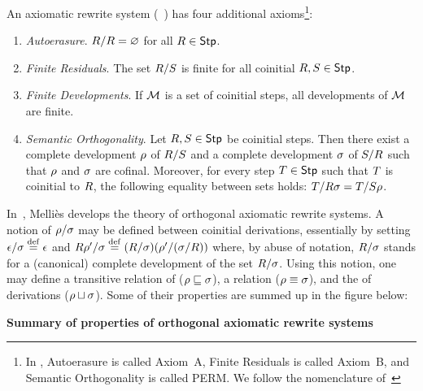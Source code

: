 An  axiomatic rewrite system (\cf~\cite[Sec.~2.3]{thesismellies})
has four additional axioms\footnote{In \cite{thesismellies},
Autoerasure is called Axiom~A, Finite Residuals is called Axiom~B, and Semantic Orthogonality is called PERM.
We follow the nomenclature of~\cite{DBLP:conf/popl/AccattoliBKL14}}:
\begin{enumerate}
\item {\em Autoerasure}.
  $R/R = \varnothing$ for all $R \in \mathsf{Stp}$.
\item {\em Finite Residuals}.
  The set $R/S$ is finite for all coinitial $R,S \in \mathsf{Stp}$.
\item {\em Finite Developments}.
  If $\mathcal{M}$ is a set of coinitial steps,
  all developments of $\mathcal{M}$ are finite.
\item {\em Semantic Orthogonality}.
  Let $R,S \in \mathsf{Stp}$ be coinitial steps.
  Then there exist a complete development $\rho$ of $R/S$
  and a complete development $\sigma$ of $S/R$
  such that $\rho$ and $\sigma$ are cofinal.
  Moreover,
  for every step $T \in \mathsf{Stp}$ such that $T$ is coinitial to $R$,
  the following equality between sets holds:
  $T/R\sigma = T/S\rho$.
\end{enumerate}
In~\cite{thesismellies}, Melli\`es develops
the theory of orthogonal axiomatic rewrite systems.
A notion of 
$\rho/\sigma$ may be defined between coinitial derivations,
essentially by setting $\epsilon/\sigma \overset{\mathrm{def}}{=} \epsilon$
and $R\rho'/\sigma \overset{\mathrm{def}}{=} (R/\sigma)(\rho'/(\sigma/R))$
where, by abuse of notation, $R/\sigma$ stands for a (canonical) complete development
of the set $R/\sigma$.
Using this notion, one may define
a transitive relation of  ($\rho \sqsubseteq \sigma$),
a  relation ($\rho \equiv \sigma$),
and the  of derivations ($\rho \sqcup \sigma$).
Some of their properties are summed up in the figure
below:
\begin{center}
{\bf Summary of properties of orthogonal axiomatic rewrite systems}
\end{center}
